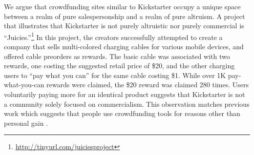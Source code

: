 \documentclass[letterpaper]{article}
\begin{document}
We argue that crowdfunding sites similar to Kickstarter occupy a unique space between a realm of pure salespersonship and a realm of pure altruism. A project that illustrates that Kickstarter is not purely altruistic nor purely commercial is ``Juicies.''\footnote{\url{http://tinyurl.com/juiciesproject}} In this project, the creators successfully attempted to create a company that sells multi-colored charging cables for various mobile devices, and offered cable preorders as rewards. The basic cable was associated with two rewards, one costing the suggested retail price of \$20, and the other charging users to ``pay what you can'' for the same cable costing \$1. While over 1K pay-what-you-can rewards were claimed, the \$20 reward was claimed 280 times. Users voluntarily paying more for an identical product suggests that Kickstarter is not a community solely focused on commercialism. This observation matches previous work which suggests that people use crowdfunding tools for reasons other than personal gain \cite{van2011fighting}.
\end{document}
